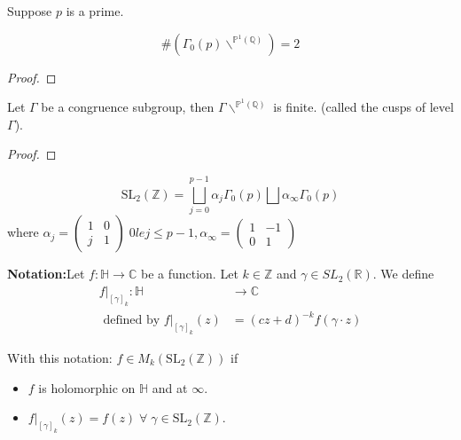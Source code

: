 \documentclass[oneside, 12pt]{scrbook}
\newcommand{\CC}{\mathbb C}
\newcommand{\QQ}{\mathbb Q}
\newcommand{\RR}{\mathbb R}
\newcommand{\ZZ}{\mathbb Z}
\newcommand{\PP}{\mathbb{P}}
\newcommand{\SL}{\mathrm{SL}}
\theoremstyle{theorem}
\begin{document}
Suppose $p$ is a prime. 
\begin{proposition}
$$\# \left( \Gamma_{0}(p)\backslash^{\PP^1(\QQ)} \right)=2$$
\end{proposition}

\begin{proof}

\end{proof}

\begin{proposition}
Let $\Gamma$ be a congruence subgroup, then $\Gamma\backslash^{\PP^1 (\QQ)}$ is finite. (called the cusps of level $\Gamma$). 
\end{proposition}

\begin{proof}

\end{proof}

\begin{exercise}
$$\SL_{2}(\ZZ) = \bigsqcup_{j=0}^{p-1} \alpha_{j} \Gamma_{0}(p) \bigsqcup \alpha_{\infty} \Gamma_{0}(p)$$ where $\alpha_{j} = \begin{pmatrix}
1 & 0 \\ j & 1
\end{pmatrix}\; 0 
le j \le p-1 ,  \alpha_{\infty} = \begin{pmatrix}
1 & -1 \\ 0 & 1
\end{pmatrix}$
\end{exercise}

\textbf{Notation:}Let $f: \mathbb{H} \rightarrow \CC$ be a function. Let $k \in \ZZ$ and $\gamma \in SL_{2}(\RR)$. We define 
\begin{align*}
f|_{[\gamma]_{k}} : \mathbb{H} &\rightarrow \CC \\
\text{ defined by } f|_{[\gamma]_{k}}(z) &= (cz+d)^{-k} f(\gamma \cdot z)
\end{align*}

With this notation: $f \in M_{k}(\SL_{2}(\ZZ))$ if 
\begin{itemize}
\item $f$ is holomorphic on $\mathbb{H}$ and at $\infty$.
\item $f|_{[\gamma]_{k}}(z) = f(z) \; \forall \; \gamma \in \SL_{2}(\ZZ)$. 
\end{itemize}
\end{document}
